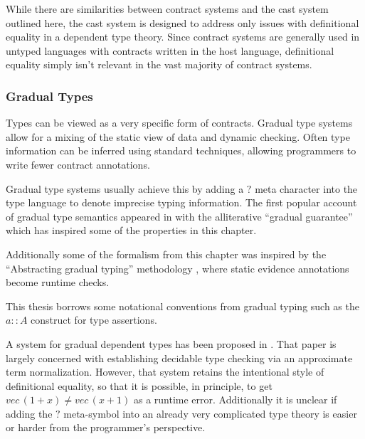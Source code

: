 While there are similarities between contract systems and the cast system outlined here, the cast system is designed to address only issues with definitional equality in a dependent type theory.
Since contract systems are generally used in untyped languages with contracts written in the host language, definitional equality simply isn't relevant in the vast majority of contract systems.
 
\subsubsection{Gradual Types}
 
Types can be viewed as a very specific form of contracts.
Gradual type systems allow for a mixing of the static view of data and dynamic checking.
Often type information can be inferred using standard techniques, allowing programmers to write fewer contract annotations.
 
Gradual type systems usually achieve this by adding a $?$ meta character into the type language to denote imprecise typing information.
The first popular account of gradual type semantics appeared in \cite{siek_et_al:LIPIcs:2015:5031} with the alliterative ``gradual guarantee'' which has inspired some of the properties in this chapter.
 
 
 
Additionally some of the formalism from this chapter was inspired by the ``Abstracting gradual typing'' methodology \cite{10.1145/2837614.2837670}, where static evidence annotations become runtime checks.
 
This thesis borrows some notational conventions from gradual typing such as the $a::A$ construct for type assertions.
 
A system for gradual dependent types has been proposed in \cite{10.1145/3341692}.
That paper is largely concerned with establishing decidable type checking via an approximate term normalization.
However, that system retains the intentional style of definitional equality, so that it is possible, in principle, to get $vec\,(1+x)\neq vec\,(x+1)$ as a runtime error.
Additionally it is unclear if adding the $?$ meta-symbol into an already very complicated type theory is easier or harder from the programmer's perspective.
 
